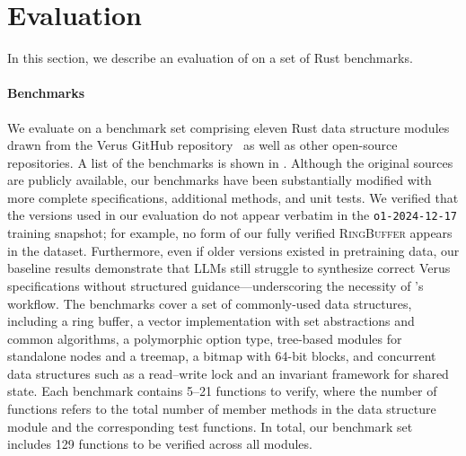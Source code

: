 \section{Evaluation}
\label{sec:evaluation}

In this section, we describe an evaluation of \toolname{} on a set of Rust benchmarks.

\paragraph{Benchmarks}
We evaluate \toolname{} on a benchmark set comprising eleven Rust data structure modules drawn from the Verus GitHub repository~\cite{verus} as well as other open-source repositories.
A list of the benchmarks is shown in .
Although the original sources are publicly available, our benchmarks have been substantially modified with more complete specifications, additional methods, and unit tests. We verified that the versions used in our evaluation do not appear verbatim in the \texttt{o1-2024-12-17} training snapshot; for example, no form of our fully verified \textsc{RingBuffer} appears in the dataset. Furthermore, even if older versions existed in pretraining data, our baseline results demonstrate that LLMs still struggle to synthesize correct Verus specifications without structured guidance---underscoring the necessity of \toolname{}'s workflow.
The benchmarks cover a set of commonly-used data structures, including a ring buffer, a vector implementation with set abstractions and common algorithms, a polymorphic option type, tree-based modules for standalone nodes and a treemap, a bitmap with 64-bit blocks, and concurrent data structures such as a read–write lock and an invariant framework for shared state. Each benchmark contains 5--21 functions to verify, where the number of functions refers to the total number of member methods in the data structure module and the corresponding test functions. In total, our benchmark set includes 129 functions to be verified across all modules. 

